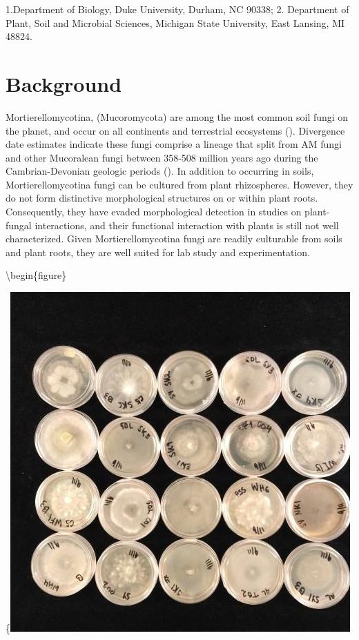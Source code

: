 \documentclass[]{book}
\begin{document}
1.Department of Biology, Duke University, Durham, NC 90338; 2. Department of Plant, Soil and Microbial Sciences, Michigan State University, East Lansing, MI 48824.

\hypertarget{background}{%
\section{Background}\label{background}}

Mortierellomycotina, (Mucoromycota) are among the most common soil fungi on the planet, and occur on all continents and terrestrial ecosystems (\citet{Wagner_2013}). Divergence date estimates indicate these fungi comprise a lineage that split from AM fungi and other Mucoralean fungi between 358-508 million years ago during the Cambrian-Devonian geologic periods (\citet{Uehling_2017}). In addition to occurring in soils, Mortierellomycotina fungi can be cultured from plant rhizospheres. However, they do not form distinctive morphological structures on or within plant roots. Consequently, they have evaded morphological detection in studies on plant-fungal interactions, and their functional interaction with plants is still not well characterized. Given Mortierellomycotina fungi are readily culturable from soils and plant roots, they are well suited for lab study and experimentation.

\textbackslash begin\{figure\}

\{\centering \includegraphics{img/Ch8_Fig1}
\end{document}
